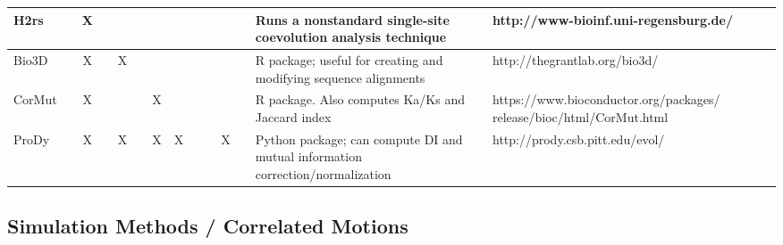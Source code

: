 \begin{table}
\begin{tabular}{@{}p{2cm}|c|c|c|c|c|c|c|c|c|c|c|p{5cm}|p{5cm}@{}}
    H2rs \cite{Janda2014a} &  & X &  &  &  &  &  &  &  &  &  & Runs a nonstandard single-site coevolution analysis technique & \tiny{http://\mbox{www-bioinf}.uni-regensburg.de/} \\ \hline
    Bio3D \cite{Skjaerven2014} &  & X &  & X &  &  &  &  &  &  &  & R package; useful for creating and modifying sequence alignments & \tiny{http://thegrantlab.org/bio3d/} \\ \hline
    CorMut \cite{Li2014d} &  & X &  &  &  & X &  &  &  &  &  & R package. Also computes Ka/Ks and Jaccard index & \tiny{https://www.bioconductor.org/packages/ release/bioc/html/CorMut.html} \\ \hline
    ProDy \cite{Liu2010,Liu2012} &  & X &  & X &  & X & X &  &  & X &  & Python package; can compute DI and mutual information correction/normalization & \tiny{http://prody.csb.pitt.edu/evol/} \\ \hline
\end{tabular}
\end{table}
\clearpage
\subsection{Simulation Methods / Correlated Motions}
